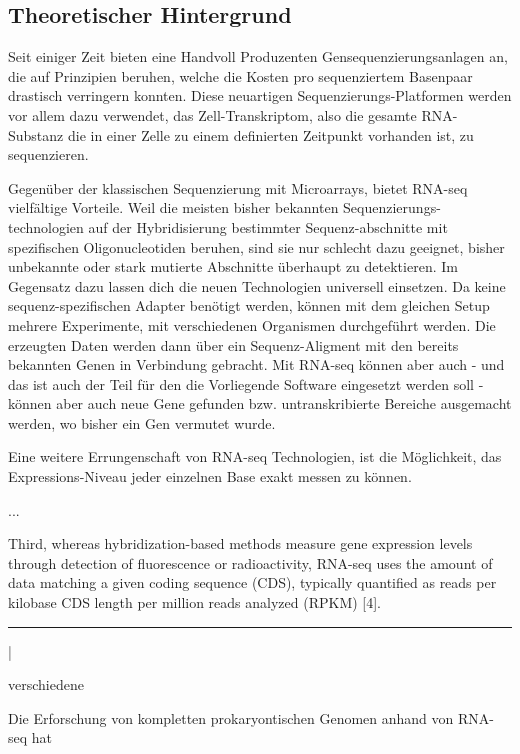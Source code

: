 \documentclass[a4paper]{thesis}
\begin{document}
\subsection{Theoretischer Hintergrund}

Seit einiger Zeit bieten eine Handvoll Produzenten Gensequenzierungsanlagen an,
die auf Prinzipien beruhen, welche die Kosten pro sequenziertem Basenpaar
drastisch verringern konnten. Diese neuartigen
Sequenzierungs-Platformen werden vor allem 
dazu verwendet, das Zell-Transkriptom, also die gesamte RNA-Substanz die
in einer Zelle zu einem definierten Zeitpunkt vorhanden ist, zu sequenzieren.

Gegenüber der klassischen Sequenzierung mit Microarrays, bietet RNA-seq
vielfältige Vorteile. Weil die meisten bisher bekannten Sequenzierungs-
technologien auf der Hybridisierung bestimmter Sequenz-abschnitte mit
spezifischen Oligonucleotiden beruhen, sind sie nur schlecht dazu geeignet,
bisher unbekannte oder stark mutierte Abschnitte überhaupt zu detektieren.
Im Gegensatz dazu lassen dich die neuen Technologien universell einsetzen. Da
keine sequenz-spezifischen Adapter benötigt werden, können mit dem gleichen
Setup mehrere Experimente, mit verschiedenen Organismen durchgeführt werden.
Die erzeugten Daten werden dann über ein Sequenz-Aligment mit den bereits
bekannten Genen in Verbindung gebracht. Mit RNA-seq können aber auch - und
das ist auch der Teil für den die Vorliegende Software eingesetzt werden
soll - können aber auch neue Gene gefunden bzw. untranskribierte Bereiche
ausgemacht werden, wo bisher ein Gen vermutet wurde.

Eine weitere Errungenschaft von RNA-seq Technologien, ist die Möglichkeit,
das Expressions-Niveau jeder einzelnen Base exakt messen zu können.

...

Third, whereas hybridization-based methods measure gene expression levels through detection of fluorescence or radioactivity, RNA-seq uses the amount of data matching a given coding sequence (CDS), typically quantified as reads per kilobase CDS length per million reads analyzed (RPKM) [4].






\vspace{1cm}\hrule\vspace{1cm}\ifx\foo\bar

verschiedene

Die Erforschung von kompletten prokaryontischen Genomen anhand von RNA-seq hat
\end{document}
